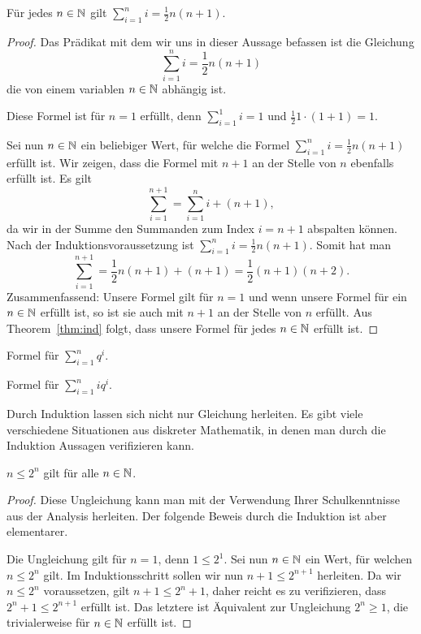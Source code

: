 \begin{thm}
	Für jedes $n \in \mathbb{N}$ gilt $\sum_{i=1}^n i = \frac{1}{2} n (n+1)$. 
\end{thm} 
\begin{proof} 
		Das Prädikat mit dem wir uns in dieser Aussage befassen ist die Gleichung $$\sum_{i=1}^n i = \frac{1}{2} n (n+1)$$ die von einem variablen $n \in \mathbb{N}$ abhängig ist. 
		
		Diese Formel ist für $n=1$ erfüllt, denn $\sum_{i=1}^1 i = 1$ und $\frac{1}{2} 1 \cdot (1+1) = 1$. 
		
		Sei nun $n \in \mathbb{N}$ ein beliebiger Wert, für welche die Formel $\sum_{i=1}^n  i = \frac{1}{2} n (n+1)$ erfüllt ist. Wir zeigen, dass die Formel mit $n+1$ an der Stelle von $n$ ebenfalls erfüllt ist. Es gilt 
		\[
			\sum_{i=1}^{n+1} = \sum_{i=1}^n i  + (n+1),
		\]
		da wir in der Summe den Summanden zum Index $i=n+1$ abspalten können. Nach der Induktionsvoraussetzung ist $\sum_{i=1}^n i = \frac{1}{2} n (n+1)$. Somit hat man 
		\[
			\sum_{i=1}^{n+1} = \frac{1}{2} n (n+1) + (n+1) = \frac{1}{2} (n+1) (n+2). 
		\]
		Zusammenfassend: Unsere Formel gilt für $n=1$ und wenn unsere Formel für ein $n \in \mathbb{N}$ erfüllt ist, so ist sie auch mit $n+1$ an der Stelle von $n$ erfüllt. Aus Theorem~\ref{thm:ind} folgt, dass unsere Formel für jedes $n \in \mathbb{N}$ erfüllt ist. 
\end{proof} 


\begin{bsp}
	Formel für $\sum_{i=1}^n q^i$. 
\end{bsp} 

\begin{bsp}
	Formel für $\sum_{i=1}^n i q^i$. 
\end{bsp} 

\begin{bem}
	Durch Induktion lassen sich nicht nur Gleichung herleiten. Es gibt viele verschiedene Situationen aus diskreter Mathematik, in denen man durch die Induktion Aussagen verifizieren kann. 
\end{bem} 

\begin{thm}
	$n \le 2^n$ gilt für alle $n \in \mathbb{N}$. 
\end{thm} 
\begin{proof} 
	Diese Ungleichung kann man mit der Verwendung Ihrer Schulkenntnisse aus der Analysis herleiten. Der folgende Beweis durch die Induktion ist aber elementarer. 
	
	Die Ungleichung gilt für $n=1$, denn $1 \le 2^1$. Sei nun $n \in \mathbb{N}$ ein Wert, für welchen $n \le 2^n$ gilt. Im Induktionsschritt sollen wir nun $n + 1 \le 2^{n+1}$ herleiten. Da wir $n \le 2^n$ voraussetzen, gilt $n+1 \le 2^n + 1$, daher reicht es zu verifizieren, dass $2^n + 1 \le 2^{n+1}$ erfüllt ist. Das letztere ist Äquivalent zur Ungleichung $2^n \ge 1$, die trivialerweise für $n \in \mathbb{N}$ erfüllt ist. 
\end{proof} 



